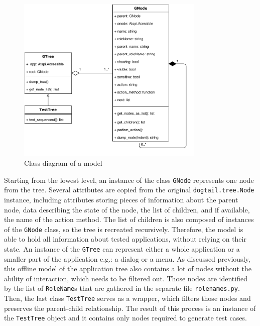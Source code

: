 \begin{figure}[hbt]
	\centering
	\includegraphics[width=0.8\textwidth,clip]{obrazky-figures/tree_diagram.pdf}
	\caption{Class diagram of a model}
	\label{tree_diagram}
\end{figure}


Starting from the lowest level, an instance of the class \texttt{GNode} represents one node from the tree. Several attributes are copied from the original \texttt{dogtail.tree.Node} instance, including attributes storing pieces of information about the parent node, data describing the state of the node, the list of children, and if available, the name of the action method. The list of children is also composed of instances of the \texttt{GNode} class, so the tree is recreated recursively. Therefore, the model is able to hold all information about tested applications, without relying on their state. An instance of the \texttt{GTree} can represent either a whole application or a smaller part of the application e.g.: a dialog or a menu. As discussed previously, this offline model of the application tree also contains a lot of nodes without the ability of interaction, which needs to be filtered out. Those nodes are identified by the list of \texttt{RoleName}s that are gathered in the separate file \texttt{rolenames.py}. Then, the last class \texttt{TestTree} serves as a wrapper, which filters those nodes and preserves the parent-child relationship. The result of this process is an instance of the \texttt{TestTree} object and it contains only nodes required to generate test cases. 

